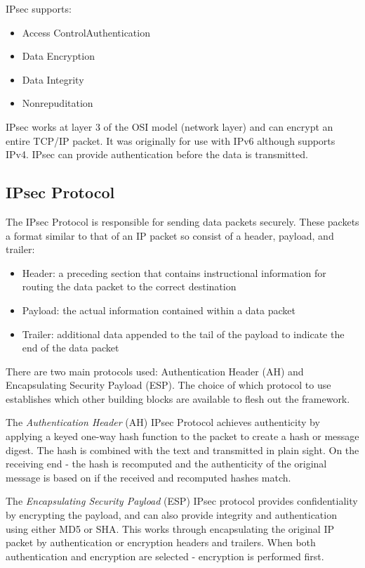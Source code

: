IPsec supports:
\begin{itemize}
    \item Access ControlAuthentication
    \item Data Encryption
    \item Data Integrity
    \item Nonrepuditation
\end{itemize}

IPsec works at layer 3 of the OSI model (network layer) and can encrypt an entire TCP/IP packet. It was originally for use with IPv6 although supports IPv4. IPsec can provide authentication before the data is transmitted.

\subsection{IPsec Protocol}
The IPsec Protocol is responsible for sending data packets securely. These packets a format similar to that of an IP packet so consist of a header, payload, and trailer:
\begin{itemize}
    \item Header: a preceding section that contains instructional information for routing the data packet to the correct destination
    \item Payload: the actual information contained within a data packet
    \item Trailer: additional data appended to the tail of the payload to indicate the end of the data packet
\end{itemize}

There are two main protocols used: Authentication Header (AH) and Encapsulating Security Payload (ESP). The choice of which protocol to use establishes which other building blocks are available to flesh out the framework.

The \textit{Authentication Header} (AH) IPsec Protocol achieves authenticity by applying a keyed one-way hash function to the packet to create a hash or message digest. The hash is combined with the text and transmitted in plain sight. On the receiving end - the hash is recomputed and the authenticity of the original message is based on if the received and recomputed hashes match.

The \textit{Encapsulating Security Payload} (ESP) IPsec protocol provides confidentiality by encrypting the payload, and can also provide integrity and authentication using either MD5 or SHA. This works through encapsulating the original IP packet by authentication or encryption headers and trailers. When both authentication and encryption are selected - encryption is performed first. 

